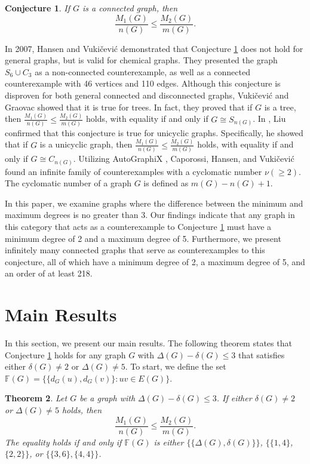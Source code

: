 \documentclass[12pt]{article}
\newtheorem{theorem}{Theorem}[section]
\newtheorem{conjecture}[theorem]{Conjecture}
\begin{document}
\begin{conjecture}\label{conj1}{\rm\cite{con1-1,con1-2,con1-3}}
If $G$ is a connected graph, then 
\[\frac{M_1(G)}{n(G)}\leq\frac{M_2(G)}{m(G)}.\]
\end{conjecture}
In 2007, Hansen and Vuki\v{c}evi\'c \cite{con1-4} demonstrated that Conjecture \ref{conj1} does not hold for general graphs, but is valid for chemical graphs. They presented the graph $ S_6 \cup C_3 $ as a non-connected counterexample, as well as a connected counterexample with 46 vertices and 110 edges. Although this conjecture is disproven for both general connected and disconnected graphs, Vuki\v{c}evi\'c and Graovac \cite{con1-5} showed that it is true for trees. In fact, they proved that if $ G$ is a tree, then 
$\frac{M_1(G)}{n(G)} \leq \frac{M_2(G)}{m(G)}$ holds, with equality if and only if $ G \cong S_{n(G)}$. In \cite{con1-6}, Liu confirmed that this conjecture is true for unicyclic graphs. Specifically, he showed that if $G$ is a unicyclic graph, then 
$\frac{M_1(G)}{n(G)} \leq \frac{M_2(G)}{m(G)}$ holds, with equality if and only if $ G \cong C_{n(G)}$. Utilizing AutoGraphiX \cite{con1-1,con1-2,con1-3}, Caporossi, Hansen, and Vuki\v{c}evi\'c \cite{con1-7} found an infinite family of counterexamples with a cyclomatic number $\nu(\geq2)$. The cyclomatic number of a graph $G$ is defined as  $m(G) - n(G) + 1$. 

In this paper, we examine graphs where the difference between the minimum and maximum degrees is no greater than 3. Our findings indicate that any graph in this category that acts as a counterexample to Conjecture \ref{conj1} must have a minimum degree of 2 and a maximum degree of 5. Furthermore, we present infinitely many connected graphs that serve as counterexamples to this conjecture, all of which have a minimum degree of 2, a maximum degree of 5, and an order of at least 218.

\section{Main Results }
In this section, we present our main results. The following theorem states that Conjecture \ref{conj1} holds for any graph \( G \) with \( \Delta(G) - \delta(G) \leq 3 \) that satisfies either \( \delta(G) \neq 2 \) or \( \Delta(G) \neq 5 \).
To start, we define the set $\mathbb{F}(G) = \{\{d_G(u), d_G(v)\} : uv \in E(G)\}$.
\begin{theorem}\label{th1}
Let $G$ be a graph with $\Delta(G)-\delta(G)\leq3$. If either $\delta(G)\neq2$ or $\Delta(G)\neq5$ holds, then
\[\frac{M_1(G)}{n(G)}\leq\frac{M_2(G)}{m(G)}.\]
The equality holds if and only if $\mathbb{F}(G)$ is either $\{\{\Delta(G),\delta(G)\}\}$, $\{\{1,4\}$, $\{2,2\}\}$, or $\{\{3,6\},\{4,4\}\}$.
\end{theorem}
\end{document}
